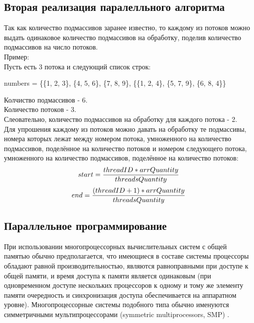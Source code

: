 \documentclass[12pt,a4paper]{article}
\numberwithin{equation}{section}
\begin{document}
\subsection{Вторая реализация паралелльного алгоритма}
Так как количество подмассивов заранее известно, то каждому из потоков можно выдать одинаковое количество подмассивов на обработку, поделив количество подмассивов на число потоков.\\
Пример: \\
Пусть есть 3 потока и следующий список строк:
\begin{center}
	numbers = \{\{1, 2, 3\}, \{4, 5, 6\}, \{7, 8, 9\}, \{\{1, 2, 4\}, \{5, 7, 9\}, \{6, 8, 4\}\}
\end{center}
Колчиство подмассивов - 6.\\
Количество потоков - 3.\\
Слеовательно, количество подмассивов на обработку для каждого потока - 2.\\
Для упрошения каждому из потоков можно давать на обработку те подмассивы, номера которых лежат между номером потока, умноженного на количество подмассивов, поделённое на количество потоков и номером следующего потока, умноженного на количество подмассивов, поделённое на количество потоков:
\begin{equation}
	start = \frac{threadID * arrQuantity}{threadsQuantity}\\
\end{equation}
\begin{equation}
	end = \frac{(threadID + 1) * arrQuantity}{threadsQuantity}\\
\end{equation}

\subsection{Параллельное программирование}
При использовании многопроцессорных вычислительных систем с общей памятью обычно предполагается, что имеющиеся в составе системы процессоры обладают равной производительностью, являются равноправными при доступе к общей памяти, и время доступа к памяти является одинаковым (при одновременном доступе нескольких процессоров к одному и тому же элементу памяти очередность и синхронизация доступа обеспечивается на аппаратном уровне). Многопроцессорные системы подобного типа обычно именуются симметричными мультипроцессорами (symmetric multiprocessors, SMP) \cite{litlink3}.\\
\end{document}
